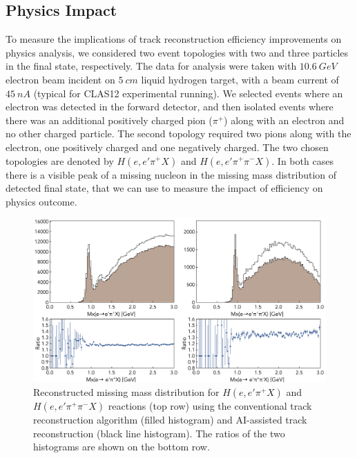 \subsection{Physics Impact}

To measure the implications of track reconstruction efficiency improvements on physics analysis, 
we considered two event topologies with two and three particles in the final state, respectively. 
The data for analysis were taken with $10.6~GeV$ electron beam incident on $5~cm$ liquid 
hydrogen target, with a beam current of $45~nA$ (typical for CLAS12 experimental running). 
We selected events where an electron was detected in the forward detector, and then isolated 
events where there was an additional positively charged pion ($\pi^+$) along with an electron 
and no other charged particle. The second topology required two pions along with the electron, 
one positively charged and one negatively charged. The two chosen topologies are denoted by 
$H(e,e'\pi^+X)$ and $H(e,e'\pi^+\pi^-X)$. In both cases there is a visible peak of a missing nucleon
in the missing mass distribution of detected final state, that we can use to measure the impact 
of efficiency on physics outcome. 

 \begin{figure}[!ht]
\begin{center}
 \includegraphics[width=6.0in]{images/physics_scan.pdf}
\caption {Reconstructed missing mass distribution for $H(e,e'\pi^+X)$ and $H(e,e'\pi^+\pi^-X)$ 
reactions (top row) using the conventional track reconstruction algorithm (filled histogram) and  
AI-assisted track reconstruction (black line histogram). The ratios of the two histograms are shown 
on the bottom row. }
 \label{physics:outcome}
 \end{center}
\end{figure}

